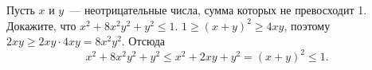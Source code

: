 \problem{}
Пусть $x$ и $y$~--- неотрицательные числа, сумма которых не превосходит 1.
Докажите, что $x^2 + 8 x^2 y^2 + y^2 \leq 1$.
\solution
$1 \geq (x + y)^2 \geq 4 x y$, поэтому
$2 x y \geq 2 x y \cdot 4 x y = 8 x^2 y^2$.
Отсюда
\[
    x^2 + 8 x^2 y^2 + y^2 \leq x^2 + 2 x y + y^2 = (x + y)^2 \leq 1
.\]
\endproblem

